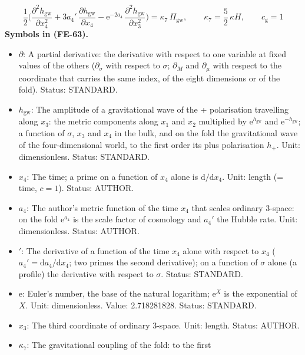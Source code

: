 \documentclass[
  10pt,
]{article}
\providecommand{\tightlist}{%
  \setlength{\itemsep}{0pt}\setlength{\parskip}{0pt}}
\begin{document}
\[
\frac{1}{2}\Big(\frac{\partial^2h_{\mathrm{gw}}}{\partial x_4^2} + 3a_4'\,\frac{\partial h_{\mathrm{gw}}}{\partial x_4}
 - \mathrm{e}^{-2a_4}\,\frac{\partial^2h_{\mathrm{gw}}}{\partial x_3^2}\Big) = \kappa_7\,\Pi_{\mathrm{gw}},\qquad
\kappa_7 = \frac52\,\kappa H,\qquad c_{\mathrm{g}} = 1 \tag{FE-63}
\] \textbf{Symbols in (FE-63).}

\begin{itemize}
\tightlist
\item
  \(\partial\): A partial derivative: the derivative with respect to one
  variable at fixed values of the others (\(\partial_\sigma\) with
  respect to \(\sigma\); \(\partial_M\) and \(\partial_\mu\) with
  respect to the coordinate that carries the same index, of the eight
  dimensions or of the fold). Status: STANDARD.
\item
  \(h_{\mathrm{gw}}\): The amplitude of a gravitational wave of the +
  polarisation travelling along \(x_3\): the metric components along
  \(x_1\) and \(x_2\) multiplied by \(\mathrm{e}^{h_{\mathrm{gw}}}\) and
  \(\mathrm{e}^{-h_{\mathrm{gw}}}\); a function of \(\sigma\), \(x_3\)
  and \(x_4\) in the bulk, and on the fold the gravitational wave of the
  four-dimensional world, to the first order its plus polarisation
  \(h_{+}\). Unit: dimensionless. Status: STANDARD.
\item
  \(x_4\): The time; a prime on a function of \(x_4\) alone is
  \(\mathrm{d}/\mathrm{d}x_4\). Unit: length (= time, \(c = 1\)).
  Status: AUTHOR.
\item
  \(a_4\): The author's metric function of the time \(x_4\) that scales
  ordinary 3-space: on the fold \(\mathrm{e}^{a_4}\) is the scale factor
  of cosmology and \(a_4'\) the Hubble rate. Unit: dimensionless.
  Status: AUTHOR.
\item
  \({}'\): The derivative of a function of the time \(x_4\) alone with
  respect to \(x_4\) (\(a_4' = \mathrm{d}a_4/\mathrm{d}x_4\); two primes
  the second derivative); on a function of \(\sigma\) alone (a profile)
  the derivative with respect to \(\sigma\). Status: STANDARD.
\item
  \(\mathrm{e}\): Euler's number, the base of the natural logarithm;
  \(\mathrm{e}^{X}\) is the exponential of \(X\). Unit: dimensionless.
  Value: 2.718281828. Status: STANDARD.
\item
  \(x_3\): The third coordinate of ordinary 3-space. Unit: length.
  Status: AUTHOR.
\item
  \(\kappa_7\): The gravitational coupling of the fold: to the first

\end{itemize}
\end{document}
